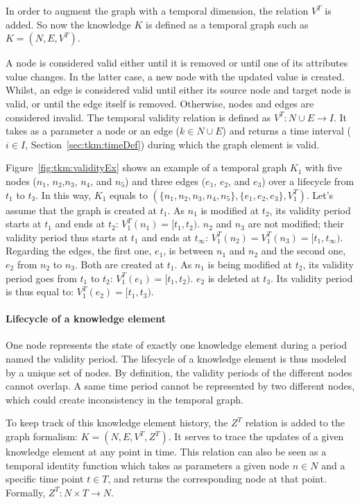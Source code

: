 In order to augment the graph with a temporal dimension, the relation $V^T$ is added.
So now the knowledge $K$ is defined as a temporal graph such as $K = (N, E, V^T)$.

A node is considered valid either until it is removed or until one of its attributes value changes. 
In the latter case, a new node with the updated value is created.
Whilst, an edge is considered valid until either its source node and target node is valid, or until the edge itself is removed.
Otherwise, nodes and edges are considered invalid.
The temporal validity relation is defined as $V^T: N \cup E \rightarrow I$.
It takes as a parameter a node or an edge ($k \in N \cup E$) and returns a time interval ($i \in I$, \cf Section~\ref{sec:tkm:timeDef}) during which the graph element is valid.

Figure~\ref{fig:tkm:validityEx} shows an example of a temporal graph $K_1$ with five nodes ($n_1$, $n_2$,$n_3$, $n_4$, and $n_5$) and three edges ($e_1$, $e_2$, and  $e_3$) over a lifecycle from $t_1$ to $t_3$.
In this way, $K_1$ equals to $(\{n_1, n_2, n_3, n_4, n_5\}, \{e_1, e_2, e_3\}, V^{T}_1)$.
Let's assume that the graph is created at $t_1$.
As $n_1$ is modified at $t_2$, its validity period starts at $t_1$ and ends at $t_2$: $V^{T}_1(n_1) = [t_1, t_2)$.
$n_2$ and $n_3$ are not modified; their validity period thus starts at $t_1$ and ends at $t_\infty$: $V^{T}_1(n_2) = V^{T}_1(n_3) = [t_1, t_\infty)$.
Regarding the edges, the first one, $e_1$, is between $n_1$ and $n_2$ and the second one, $e_2$ from $n_2$ to $n_3$.
Both are created at $t_1$.
As $n_1$ is being modified at $t_2$, its validity period goes from $t_1$ to $t_2$:  $V^{T}_1(e_1) = [t_1, t_2)$.
$e_2$ is deleted at $t_3$.
Its validity period is thus equal to: $V^{T}_1(e_2) = [t_1, t_3)$.

\paragraph{Lifecycle of a knowledge element}
One node represents the state of exactly one knowledge element during a period named the validity period.
The lifecycle of a knowledge element is thus modeled by a unique set of nodes.
By definition, the validity periods of the different nodes cannot overlap.
A same time period cannot be represented by two different nodes, which could create inconsistency in the temporal graph.

To keep track of this knowledge element history, the $Z^T$ relation is added to the graph formalism: $K = (N, E, V^T, Z^T)$.
It serves to trace the updates of a given knowledge element at any point in time. 
This relation can also be seen as a temporal identity function which takes as parameters a given node $n \in N$ and a specific time point $t \in T$, and returns the corresponding node at that point. 
Formally, $Z^T: N \times T \rightarrow N$. 

